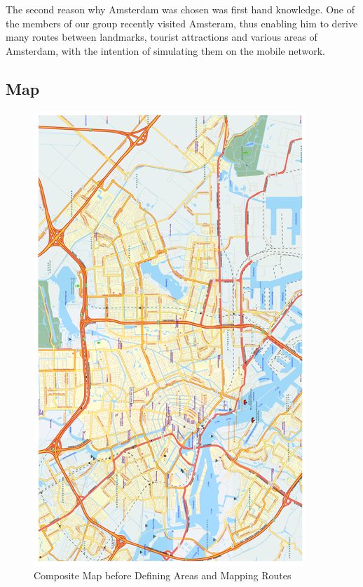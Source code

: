 \documentclass[a4paper,12pt]{article}
\begin{document}
The second reason why Amsterdam was chosen was first hand knowledge. One
of the members of our group recently visited Amsteram, thus enabling him
to derive many routes between landmarks, tourist attractions and various
areas of Amsterdam, with the intention of simulating them on the mobile
network.

\subsection{Map}


\begin{figure}[h]

\includegraphics{amsterdam.png}

\caption{Composite Map before Defining Areas and Mapping Routes}

\end{figure}

\pagebreak
\end{document}
